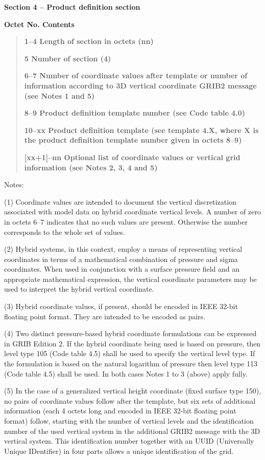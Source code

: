 \textbf{Section 4 -- Product definition section\\
}

\textbf{Octet No. Contents}

\begin{quote}
\textbf{1--4 Length of section in octets (nn)}

\textbf{5 Number of section (4)}

\textbf{6--7 Number of coordinate values after template or number of information according to 3D vertical coordinate GRIB2 message (see Notes 1 and 5)}

\textbf{8--9 Product definition template number (see Code table 4.0)}

\textbf{10--xx Product definition template (see template 4.X, where X is the product definition template number given in octets 8--9)}

\textbf{{[}xx+1{]}--nn Optional list of coordinate values or vertical grid information (see Notes 2, 3, 4 and 5)}
\end{quote}

Notes:

(1) Coordinate values are intended to document the vertical discretization associated with model data on hybrid coordinate vertical levels. A number of zero in octets 6--7 indicates that no such values are present. Otherwise the number corresponds to the whole set of values.

(2) Hybrid systems, in this context, employ a means of representing vertical coordinates in terms of a mathematical combination of pressure and sigma coordinates. When used in conjunction with a surface pressure field and an appropriate mathematical expression, the vertical coordinate parameters may be used to interpret the hybrid vertical coordinate.

(3) Hybrid coordinate values, if present, should be encoded in IEEE 32-bit floating point format. They are intended to be encoded as pairs.

(4) Two distinct pressure-based hybrid coordinate formulations can be expressed in GRIB Edition 2. If the hybrid coordinate being used is based on pressure, then level type 105 (Code table 4.5) shall be used to specify the vertical level type. If the formulation is based on the natural logarithm of pressure then level type 113 (Code table 4.5) shall be used. In both cases Notes 1 to 3 (above) apply fully.

(5) In the case of a generalized vertical height coordinate (fixed surface type 150), no pairs of coordinate values follow after the template, but six sets of additional information (each 4 octets long and encoded in IEEE 32-bit floating point format) follow, starting with the number of vertical levels and the identification number of the used vertical system in the additional GRIB2 message with the 3D vertical system. This identification number together with an UUID (Universally Unique IDentifier) in four parts allows a unique identification of the grid.

